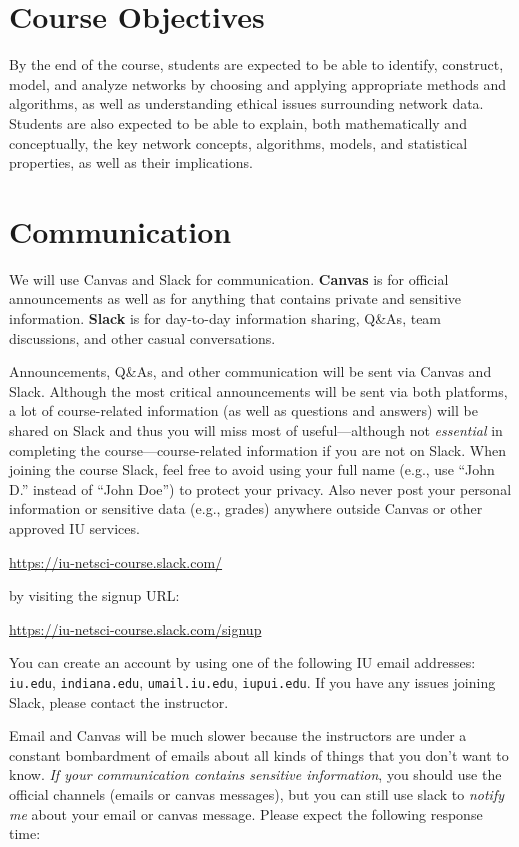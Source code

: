 \documentclass[11pt,article,oneside]{memoir} %
\begin{document}
\section{Course Objectives} %

By the end of the course, students are expected to be able to identify, construct, model, and analyze networks by choosing and applying appropriate methods and algorithms, as well as understanding ethical issues surrounding network data.
Students are also expected to be able to explain, both mathematically and conceptually, the key network concepts, algorithms, models, and statistical properties, as well as their implications.
\section{Communication} %

We will use Canvas and Slack for communication. \textbf{Canvas} is for official announcements as well as for anything that contains private and sensitive information. \textbf{Slack} is for day-to-day information sharing, Q\&As, team discussions, and other casual conversations. 

Announcements, Q\&As, and other communication will be sent via Canvas and Slack. 
Although the most critical announcements will be sent via both platforms, a lot of course-related information (as well as questions and answers) will be shared on Slack and thus you will miss most of useful---although not \emph{essential} in completing the course---course-related information if you are not on Slack. 
When joining the course Slack, feel free to avoid using your full name (e.g., use ``John D.'' instead of ``John Doe'') to protect your privacy. 
Also never post your personal information or sensitive data (e.g., grades) anywhere outside Canvas or other approved IU services. 

\url{https://iu-netsci-course.slack.com/}

by visiting the signup URL:

\url{https://iu-netsci-course.slack.com/signup}

You can create an account by using one of the following IU email addresses: \texttt{iu.edu}, \texttt{indiana.edu}, \texttt{umail.iu.edu}, \texttt{iupui.edu}.
If you have any issues joining Slack, please contact the instructor.

Email and Canvas will be much slower because the instructors are under a constant bombardment of emails about all kinds of things that you don't want to know. \emph{If your communication contains sensitive information}, you should use the official channels (emails or canvas messages), but you can still use slack to \emph{notify me} about your email or canvas message. Please expect the following response time:
\end{document}
